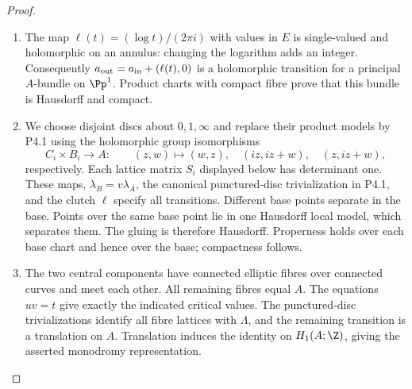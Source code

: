 \begin{proof}

\begin{enumerate}[label={$\langle1\rangle$\arabic*.},leftmargin=*]
\item The map $\ell(t)=(\log t)/(2\pi i)$ with values in $E$ is single-valued and
holomorphic on an annulus: changing the logarithm adds an integer.
Consequently $a_{\rm out}=a_{\rm in}+(\ell(t),0)$ is a holomorphic transition
for a principal $A$-bundle on $\Pp^1$. Product charts with compact fibre
prove that this bundle is Hausdorff and compact.

\item We choose disjoint discs about $0,1,\infty$ and replace their product models
by P4.1 using the holomorphic group isomorphisms
\[
 C_i\times B_i\longrightarrow A:\qquad
 (z,w)\mapsto(w,z),\quad(iz,iz+w),\quad(z,iz+w),
\]
respectively. Each lattice matrix $S_i$ displayed below has determinant
one. These maps, $\lambda_B=v\lambda_A$, the canonical punctured-disc
trivialization in P4.1, and the clutch $\ell$ specify all transitions.
Different base points separate in the base. Points over the same base
point lie in one Hausdorff local model, which separates them. The gluing is
therefore Hausdorff. Properness holds over each base chart and hence over
the base; compactness follows.

\item The two central components have connected elliptic fibres over connected
curves and meet each other. All remaining fibres equal $A$. The equations
$uv=t$ give exactly the indicated critical values. The punctured-disc
trivializations identify all fibre lattices with $\Lambda$, and the remaining
transition is a translation on $A$. Translation induces the identity on
$H_1(A;\Z)$, giving the asserted monodromy representation.

\end{enumerate}
\end{proof}
